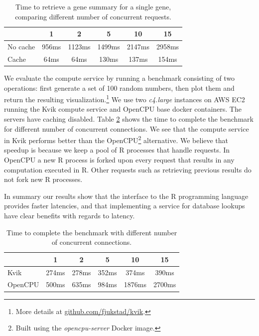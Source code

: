 \begin{table}[h]
\centering
    \caption{Time to retrieve a gene summary for a single gene, comparing
    different number of concurrent requests.}
    \begin{tabular}{| l | c | c | c | c | c | }
        \hline 
        & 1 & 2 & 5 & 10 & 15 \\ 
      \hline			
      No cache & 956ms & 1123ms & 1499ms & 2147ms & 2958ms\\
      \hline
      Cache & 64ms & 64ms & 130ms & 137ms & 154ms\\
      \hline  
    \end{tabular}
\label{db}
\end{table} 

We evaluate the compute service by running a benchmark consisting of two
operations: first generate a set of 100 random numbers, then plot them and
return the resulting visualization.\footnote{More details at
\url{github.com/fjukstad/kvik}.} We use two \emph{c4.large} instances on AWS EC2
running the Kvik compute service and OpenCPU base docker containers. The servers
have caching disabled.  Table \ref{kvikopencpucomparison} shows the time to
complete the benchmark for different number of concurrent connections. We see
that the compute service in Kvik performs better than the OpenCPU\footnote{Built
using the \textit{opencpu-server} Docker image.} alternative. We believe that
speedup is because we keep a pool of R processes that handle requests. In
OpenCPU a new R process is forked upon every request that results in any
computation executed in R. Other requests such as retrieving previous results do
not fork new R processes. 

In summary our results show that the interface to the R programming language
provides faster latencies, and that implementing a service for database lookups
have clear benefits with regards to latency. 

\begin{table}[h]
\centering
    \caption{Time to complete the benchmark with different number of
    concurrent connections.}
    \begin{tabular}{| l | c | c | c | c | c | }
        \hline 
       & 1 & 2 & 5 & 10 & 15 \\ 
      \hline			
      Kvik & 274ms & 278ms & 352ms & 374ms & 390ms\\
      \hline
      OpenCPU & 500ms & 635ms & 984ms & 1876ms & 2700ms\\
      \hline  
    \end{tabular}
\label{kvikopencpucomparison}
\end{table} 

